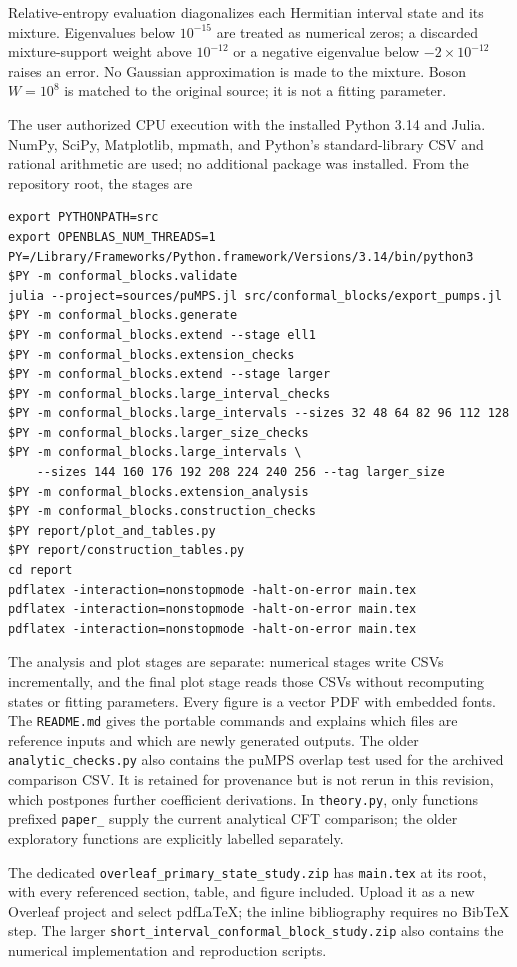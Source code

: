 Relative-entropy evaluation diagonalizes each Hermitian interval state
and its mixture. Eigenvalues below $10^{-15}$ are treated as numerical
zeros; a discarded mixture-support weight above $10^{-12}$ or a
negative eigenvalue below $-2\times10^{-12}$ raises an error.
No Gaussian approximation is made to the mixture. Boson $W=10^8$
is matched to the original source; it is not a fitting parameter.

The user authorized CPU execution with the installed Python 3.14 and Julia.
NumPy, SciPy, Matplotlib, mpmath, and Python's standard-library CSV and rational
arithmetic are used; no additional package was installed. From the
repository root, the stages are
\begin{verbatim}
export PYTHONPATH=src
export OPENBLAS_NUM_THREADS=1
PY=/Library/Frameworks/Python.framework/Versions/3.14/bin/python3
$PY -m conformal_blocks.validate
julia --project=sources/puMPS.jl src/conformal_blocks/export_pumps.jl
$PY -m conformal_blocks.generate
$PY -m conformal_blocks.extend --stage ell1
$PY -m conformal_blocks.extension_checks
$PY -m conformal_blocks.extend --stage larger
$PY -m conformal_blocks.large_interval_checks
$PY -m conformal_blocks.large_intervals --sizes 32 48 64 82 96 112 128
$PY -m conformal_blocks.larger_size_checks
$PY -m conformal_blocks.large_intervals \
    --sizes 144 160 176 192 208 224 240 256 --tag larger_size
$PY -m conformal_blocks.extension_analysis
$PY -m conformal_blocks.construction_checks
$PY report/plot_and_tables.py
$PY report/construction_tables.py
cd report
pdflatex -interaction=nonstopmode -halt-on-error main.tex
pdflatex -interaction=nonstopmode -halt-on-error main.tex
pdflatex -interaction=nonstopmode -halt-on-error main.tex
\end{verbatim}
The analysis and plot stages are separate: numerical stages write CSVs
incrementally, and the final plot stage reads those CSVs without recomputing
states or fitting parameters. Every figure is a vector PDF with embedded
fonts. The \texttt{README.md} gives the portable commands and explains
which files are reference inputs and which are newly generated outputs.
The older \texttt{analytic\_checks.py} also contains the puMPS overlap
test used for the archived comparison CSV. It is retained for provenance
but is not rerun in this revision, which postpones further coefficient
derivations. In \texttt{theory.py}, only functions prefixed
\texttt{paper\_} supply the current analytical CFT comparison; the older
exploratory functions are explicitly labelled separately.

The dedicated \texttt{overleaf\_primary\_state\_study.zip} has
\texttt{main.tex} at its root, with every referenced section, table,
and figure included. Upload it as a new Overleaf project and select
pdfLaTeX; the inline bibliography requires no BibTeX step.
The larger \texttt{short\_interval\_conformal\_block\_study.zip}
also contains the numerical implementation and reproduction scripts.
